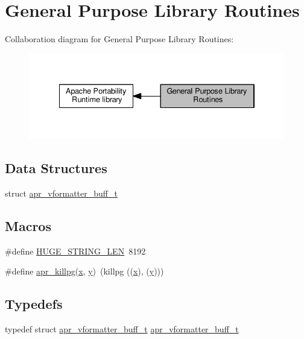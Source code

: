\hypertarget{group__apr__lib}{}\section{General Purpose Library Routines}
\label{group__apr__lib}
Collaboration diagram for General Purpose Library Routines\+:
\nopagebreak
\begin{figure}[H]
\begin{center}
\leavevmode
\includegraphics[width=334pt]{group__apr__lib}
\end{center}
\end{figure}
\subsection*{Data Structures}
\begin{DoxyCompactItemize}
\item 
struct \hyperlink{structapr__vformatter__buff__t}{apr\+\_\+vformatter\+\_\+buff\+\_\+t}
\end{DoxyCompactItemize}
\subsection*{Macros}
\begin{DoxyCompactItemize}
\item 
\#define \hyperlink{group__apr__lib_ga0c9dd98f46b90b5bcd4cbf75e252d0da}{H\+U\+G\+E\+\_\+\+S\+T\+R\+I\+N\+G\+\_\+\+L\+EN}~8192
\item 
\#define \hyperlink{group__apr__lib_gaa3b0264aadbd9f8d805252fb1ca1cd0e}{apr\+\_\+killpg}(\hyperlink{pcregrep_8txt_a4242e9148f20c002763bf4ba53b26ad6}{x},  \hyperlink{group__MOD__CACHE_gad4d47f76a849e2c428e3dd7f8c4eab1f}{y})~(killpg ((\hyperlink{pcregrep_8txt_a4242e9148f20c002763bf4ba53b26ad6}{x}), (\hyperlink{group__MOD__CACHE_gad4d47f76a849e2c428e3dd7f8c4eab1f}{y})))
\end{DoxyCompactItemize}
\subsection*{Typedefs}
\begin{DoxyCompactItemize}
\item 
typedef struct \hyperlink{structapr__vformatter__buff__t}{apr\+\_\+vformatter\+\_\+buff\+\_\+t} \hyperlink{group__apr__lib_ga5e9986deebda40f2d1cf8364fa03c3c5}{apr\+\_\+vformatter\+\_\+buff\+\_\+t}
\end{DoxyCompactItemize}
